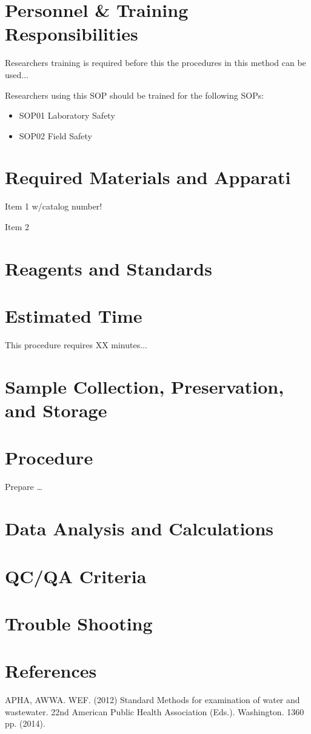 \documentclass[12pt]{../SOP3_beta}
\begin{document}
\section{Personnel \& Training Responsibilities}

\NP Researchers training is required before this the procedures in this method can be used... 

\NP Researchers using this SOP should be trained for the following SOPs:

\begin{itemize}
  \item SOP01 Laboratory Safety
  \item SOP02 Field Safety
\end{itemize}

\section{Required Materials and Apparati}

\NP Item 1 w/catalog number!

\NP Item 2

\section{Reagents and Standards}

\section{Estimated Time}

\NP This procedure requires XX minutes...

\section{Sample Collection, Preservation, and Storage}

\section{Procedure}

\NP Prepare \dots

\NP

\section{Data Analysis and Calculations}

\section{QC/QA Criteria}

\section{Trouble Shooting}

\section{References}

\NP APHA, AWWA. WEF. (2012) Standard Methods for examination of water and wastewater. 22nd American Public Health Association (Eds.). Washington. 1360 pp. (2014).
\end{document}
